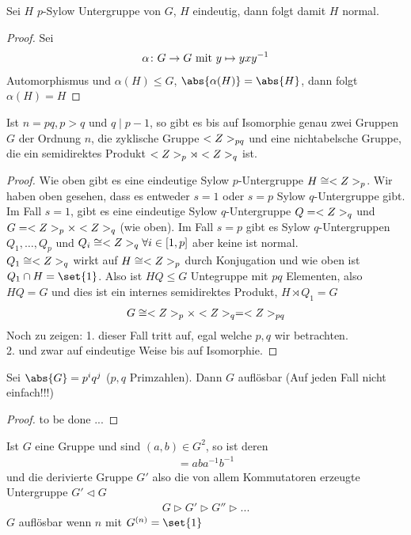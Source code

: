 \begin{proposition}
	Sei $H$ $p$-Sylow Untergruppe von $G$, $H$ eindeutig, dann folgt damit $H$ normal.
\end{proposition}
\begin{proof}
		Sei
	\begin{align*}
	\alpha \colon G \to G \mit y \mapsto y x y^{-1}
	\end{align*}
	Automorphismus und $\alpha(H) \le G$, $\abs{\alpha(H)} = \abs{H}$, dann folgt $\alpha(H) = H$
\end{proof}
\begin{proposition}
	Ist $n = pq, p>q$ und $q \mid p-1$, so gibt es bis auf Isomorphie genau zwei Gruppen $G$ der Ordnung $n$, die zyklische Gruppe $\Z_{pq}$ und eine nichtabelsche Gruppe, die ein semidirektes Produkt $\Z_p \rtimes\Z_q$ ist.
\end{proposition}
\begin{proof}
	Wie oben gibt es eine eindeutige Sylow $p$-Untergruppe $H \cong \Z_p$. Wir haben oben gesehen, dass es entweder $s=1$ oder $s = p$ Sylow $q$-Untergruppe gibt. Im Fall $s=1$, gibt es eine eindeutige Sylow $q$-Untergruppe $Q = \Z_q$ und $G = \Z_p \times \Z_q$ (wie oben). Im Fall $s=p$ gibt es Sylow $q$-Untergruppen $Q_1, \dots, Q_p$ und $Q_i \cong \Z_q \forall i \in [1,p]$ aber keine ist normal.\\
	$Q_1 \cong \Z_q$ wirkt auf $H \cong \Z_p$ durch Konjugation und wie oben ist $Q_1 \cap H = \set{1}$. Also ist $HQ \le G$ Untegruppe mit $pq$ Elementen, also $HQ = G$ und dies ist ein internes semidirektes Produkt, $H \rtimes Q_1 = G$
	\begin{align*}
		G \cong \Z_p \times \Z_q = \Z_{pq}
	\end{align*}
	Noch zu zeigen: 1. dieser Fall tritt auf, egal welche $p,q$ wir betrachten.\\
	2. und zwar auf eindeutige Weise bis auf Isomorphie.
\end{proof}
\begin{proposition}
	Sei $\abs{G} = p^i q^j$ ($p,q$ Primzahlen). Dann $G$ auflösbar (Auf jeden Fall nicht einfach!!!)
\end{proposition}
\begin{proof}
	to be done ...
\end{proof}
\begin{definition}
	Ist $G$ eine Gruppe und sind $(a,b) \in G^2$, so ist deren 
	\begin{align*}
		[a,b] = aba^{-1}b^{-1}
	\end{align*}
	und die derivierte Gruppe $G'$ also die von allem Kommutatoren erzeugte Untergruppe $G' \lhd G$
	\begin{align*}
		G \rhd G' \rhd G'' \rhd ...
	\end{align*}
	$G$ auflösbar wenn $n$ mit $G^{(n)} = \set{1}$
\end{definition}
